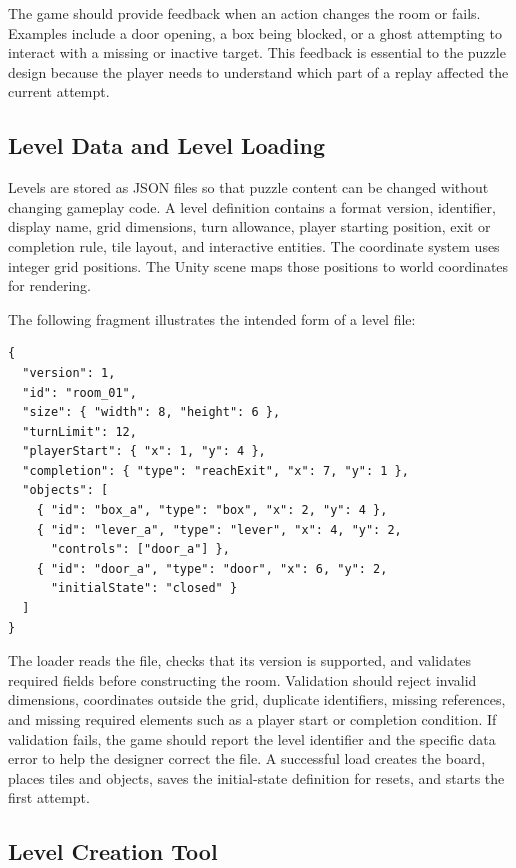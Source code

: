 The game should provide feedback when an action changes the room or fails. Examples include a door opening, a box being blocked, or a ghost attempting to interact with a missing or inactive target. This feedback is essential to the puzzle design because the player needs to understand which part of a replay affected the current attempt.

\subsection{Level Data and Level Loading}

Levels are stored as JSON files so that puzzle content can be changed without changing gameplay code. A level definition contains a format version, identifier, display name, grid dimensions, turn allowance, player starting position, exit or completion rule, tile layout, and interactive entities. The coordinate system uses integer grid positions. The Unity scene maps those positions to world coordinates for rendering.

The following fragment illustrates the intended form of a level file:

\begin{verbatim}
{
  "version": 1,
  "id": "room_01",
  "size": { "width": 8, "height": 6 },
  "turnLimit": 12,
  "playerStart": { "x": 1, "y": 4 },
  "completion": { "type": "reachExit", "x": 7, "y": 1 },
  "objects": [
    { "id": "box_a", "type": "box", "x": 2, "y": 4 },
    { "id": "lever_a", "type": "lever", "x": 4, "y": 2,
      "controls": ["door_a"] },
    { "id": "door_a", "type": "door", "x": 6, "y": 2,
      "initialState": "closed" }
  ]
}
\end{verbatim}

The loader reads the file, checks that its version is supported, and validates required fields before constructing the room. Validation should reject invalid dimensions, coordinates outside the grid, duplicate identifiers, missing references, and missing required elements such as a player start or completion condition. If validation fails, the game should report the level identifier and the specific data error to help the designer correct the file. A successful load creates the board, places tiles and objects, saves the initial-state definition for resets, and starts the first attempt.

\subsection{Level Creation Tool}

